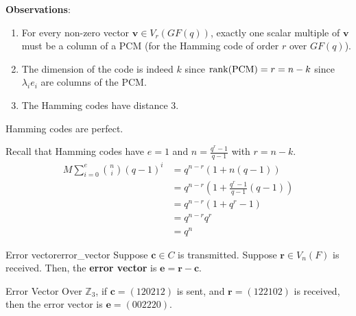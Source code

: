 \textbf{Observations}:
\begin{enumerate}[label=(\roman*)]
    \item For every non-zero vector $ \symbf{v}\in V_r(GF(q)) $, exactly one scalar multiple of $ \symbf{v} $
          must be a column of a PCM (for the Hamming code of order $ r $ over $ GF(q) $).
    \item The dimension of the code is indeed $ k $ since $ \operatorname{rank}(\text{PCM})=r=n-k $
          since $ \lambda_i e_i $ are columns of the PCM\@.
    \item The Hamming codes have distance 3.
\end{enumerate}

\begin{Theorem}{}{}
    Hamming codes are perfect.
\end{Theorem}

\begin{Proof}{}{}
    Recall that Hamming codes have $ e=1 $ and $ n=\frac{q^r-1}{q-1} $ with $ r=n-k $.
    \begin{align*}
        M \sum\limits_{i=0}^{e} \binom{n}{i}(q-1)^i
         & =q^{n-r}(1+n(q-1))                               \\
         & =q^{n-r}\left( 1+\frac{q^r-1}{q-1} (q-1) \right) \\
         & = q^{n-r}(1+q^r-1)                               \\
         & =q^{n-r}q^r                                      \\
         & =q^n
    \end{align*}
\end{Proof}

\begin{Definition}{Error vector}{error_vector}
    Suppose $ \symbf{c}\in C $ is transmitted. Suppose $ \symbf{r}\in V_n(F) $ is received.
    Then, the \textbf{error vector} is $ \symbf{e}=\symbf{r}-\symbf{c} $.
\end{Definition}

\begin{Example}{Error Vector}{}
    Over $ \mathbb{Z}_3 $, if $ \symbf{c}=(120212) $ is sent, and $ \symbf{r}=(122102) $ is received, then
    the error vector is $ \symbf{e}=(002220) $.
\end{Example}
